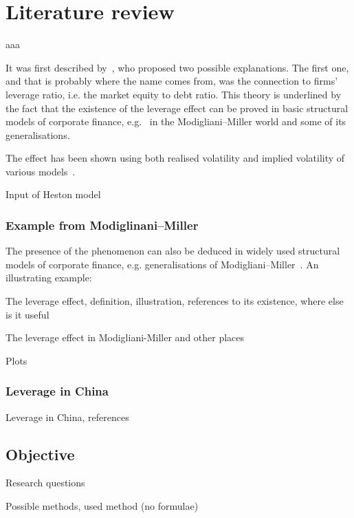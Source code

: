 \section{Literature review}

aaa

It was first described by~\citet{black1976studies}, who proposed two possible explanations.
The first one, and that is probably where the name comes from, was the connection to firms' leverage ratio, i.e. the market equity to debt ratio.
This theory is underlined by the fact that the existence of the leverage effect can be proved in basic structural models of corporate finance, e.g.~\citeauthor{Christie1982} in the Modigliani--Miller world and some of its generalisations.

The effect has been shown using both realised volatility and implied volatility of various models~\citep{Bouchaud2001,Harvey1996,Christie1982,french1987expected}.

Input of Heston model

\subsubsection{Example from Modiglinani--Miller}

The presence of the phenomenon can also be deduced in widely used structural models of corporate finance, e.g. generalisations of Modigliani--Miller~\citep{Christie1982}.
An illustrating example:  

The leverage effect, definition, illustration, references to its existence, where else is it useful

The leverage effect in Modigliani-Miller and other places

Plots

\subsubsection{Leverage in China}

Leverage in China, references

\subsection{Objective}

Research questions

Possible methods, used method (no formulae)